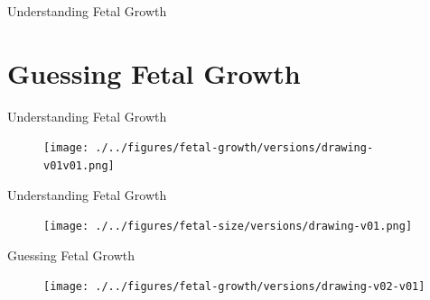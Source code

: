 

{
\begin{frame}{}

\BigSizeFont
Understanding Fetal Growth
\end{frame}
}




\section{Guessing Fetal Growth}



{
\begin{frame}{Understanding Fetal Growth}
      \begin{figure}
        \centering
        \texttt{[image: ./../figures/fetal-growth/versions/drawing-v01v01.png]}
      \end{figure}
\end{frame}
}




{
\begin{frame}{Understanding Fetal Growth}
      \begin{figure}
        \centering
        \texttt{[image: ./../figures/fetal-size/versions/drawing-v01.png]}
      \end{figure}
\end{frame}
}


{
\begin{frame}{Guessing Fetal Growth}
      \begin{figure}
        \centering
        \texttt{[image: ./../figures/fetal-growth/versions/drawing-v02-v01]}
      \end{figure}
\end{frame}
}




